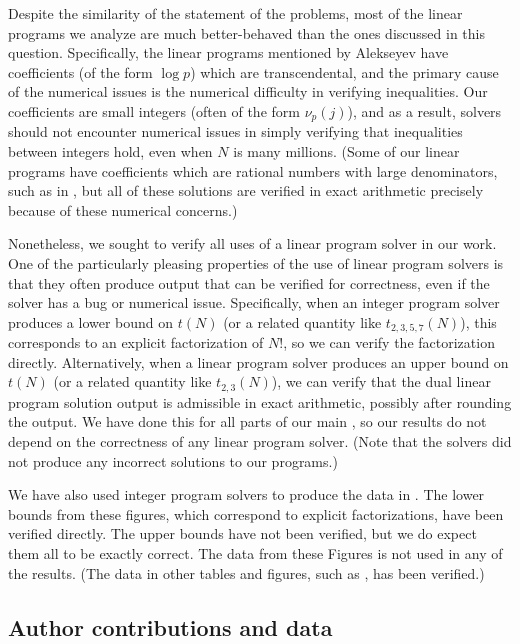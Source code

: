 \documentclass[10pt,a4paper,reqno]{amsart}
\numberwithin{equation}{section}
\theoremstyle{plain}
\theoremstyle{definition}
\begin{document}
Despite the similarity of the statement of the problems, most of the linear programs we analyze are much better-behaved than the ones discussed in this question.
Specifically, the linear programs mentioned by Alekseyev have coefficients (of the form $\log p$) which are transcendental, and the primary cause of the numerical issues is the numerical difficulty in verifying inequalities.
Our coefficients are small integers (often of the form $\nu_p(j)$), and as a result, solvers should not encounter numerical issues in simply verifying that inequalities between integers hold, even when $N$ is many millions.
(Some of our linear programs have coefficients which are rational numbers with large denominators, such as in , but all of these solutions are verified in exact arithmetic precisely because of these numerical concerns.)

Nonetheless, we sought to verify all uses of a linear program solver in our work.
One of the particularly pleasing properties of the use of linear program solvers is that they often produce output that can be verified for correctness, even if the solver has a bug or numerical issue.
Specifically, when an integer program solver produces a lower bound on $t(N)$ (or a related quantity like $t_{2,3,5,7}(N)$), this corresponds to an explicit factorization of $N!$, so we can verify the factorization directly.
Alternatively, when a linear program solver produces an upper bound on $t(N)$ (or a related quantity like $t_{2,3}(N)$), we can verify that the dual linear program solution output is admissible in exact arithmetic, possibly after rounding the output.
We have done this for all parts of our main , so our results do not depend on the correctness of any linear program solver.
(Note that the solvers did not produce any incorrect solutions to our programs.)

We have also used integer program solvers to produce the data in .
The lower bounds from these figures, which correspond to explicit factorizations, have been verified directly.
The upper bounds have not been verified, but we do expect them all to be exactly correct.
The data from these Figures is not used in any of the results.
(The data in other tables and figures, such as , has been verified.)


\subsection{Author contributions and data}
\end{document}
